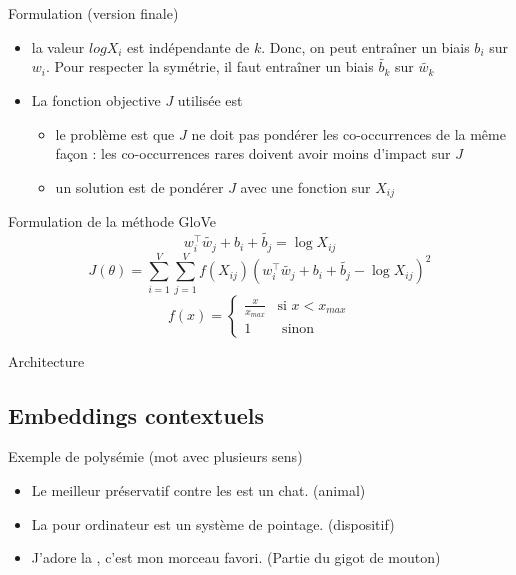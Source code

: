 \documentclass{KodeBook}
\begin{document}
Formulation (version finale)
\begin{itemize}
	\item la valeur $log X_i$ est indépendante de $k$. Donc, on peut entraîner un biais $b_i$ sur $w_i$. Pour respecter la symétrie, il faut entraîner un biais $\tilde{b_k}$ sur $\tilde{w_k}$ 
	\item La fonction objective $J$ utilisée est 
	\begin{itemize}
		\item le problème est que $J$ ne doit pas pondérer les co-occurrences de la même façon : les co-occurrences rares doivent avoir moins d'impact sur $J$
		\item un solution est de pondérer $J$ avec une fonction sur $X_{ij}$
	\end{itemize}
\end{itemize}

\vspace{-6pt}
\begin{block}{Formulation de la méthode GloVe}\vspace{-6pt}
	\[w_i^\top \tilde{w_j} + b_i + \tilde{b_j} = \log X_{ij} \]
	\[J(\theta) = \sum_{i=1}^{V} \sum_{j=1}^{V} f(X_{ij}) (w_i^\top \tilde{w_j} + b_i + \tilde{b_j} - \log X_{ij})^2\]
	\vspace{-12pt}\[f(x) = \begin{cases}
	\frac{x}{x_{max}} & \text{si } x < x_{max} \\
	1 & \text{ sinon}
	\end{cases}\]
	\vspace{-6pt}\end{block}

Architecture
\begin{center}
\end{center}

\subsection{Embeddings contextuels}

\begin{exampleblock}{Exemple de polysémie (mot avec plusieurs sens)}
	\begin{itemize}
		\item Le meilleur préservatif contre les  est un chat. (animal)
		\item La  pour ordinateur est un système de pointage. (dispositif)
		\item J'adore la , c'est mon morceau favori. (Partie du gigot de mouton)
	\end{itemize}
\end{exampleblock}
\end{document}
